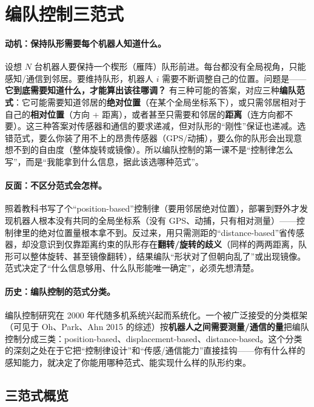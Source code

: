 \section{编队控制三范式}
\label{sec:cs-formation}

\paragraph{动机：保持队形需要每个机器人知道什么。}
设想 $N$ 台机器人要保持一个楔形（雁阵）队形前进。每台都没有全局视角，只能感知/通信到邻居。要维持队形，机器人 $i$ 需要不断调整自己的位置。问题是——\textbf{它到底需要知道什么，才能算出该往哪调？} 有三种可能的答案，对应三种\textbf{编队范式}：它可能需要知道邻居的\textbf{绝对位置}（在某个全局坐标系下），或只需邻居相对于自己的\textbf{相对位置}（方向 + 距离），或者甚至只需要和邻居的\textbf{距离}（连方向都不要）。这三种答案对传感器和通信的要求递减，但对队形的“刚性”保证也递减。选错范式，要么你装了用不上的昂贵传感器（GPS/动捕），要么你的队形会出现意想不到的自由度（整体旋转或镜像）。所以编队控制的第一课不是“控制律怎么写”，而是“我能拿到什么信息，据此该选哪种范式”。

\paragraph{反面：不区分范式会怎样。}
照着教科书写了个“position-based”控制律（要用邻居绝对位置），部署到野外才发现机器人根本没有共同的全局坐标系（没有 GPS、动捕，只有相对测量）——控制律里的绝对位置量根本拿不到。反过来，用只需测距的“distance-based”省传感器，却没意识到仅靠距离约束的队形存在\textbf{翻转/旋转的歧义}（同样的两两距离，队形可以整体旋转、甚至镜像翻转），结果编队“形状对了但朝向乱了”或出现镜像。范式决定了“什么信息够用、什么队形能唯一确定”，必须先想清楚。

\paragraph{历史：编队控制的范式分类。}
编队控制研究在 2000 年代随多机系统兴起而系统化。一个被广泛接受的分类框架（可见于 Oh、Park、Ahn 2015 的综述）按\textbf{机器人之间需要测量/通信的量}把编队控制分成三类：position-based、displacement-based、distance-based\cite{oh2015formation}。这个分类的深刻之处在于它把“控制律设计”和“传感/通信能力”直接挂钩——你有什么样的感知能力，就决定了你能用哪种范式、能实现什么样的队形约束。

\subsection{三范式概览}
\label{sec:cs-form-three}

